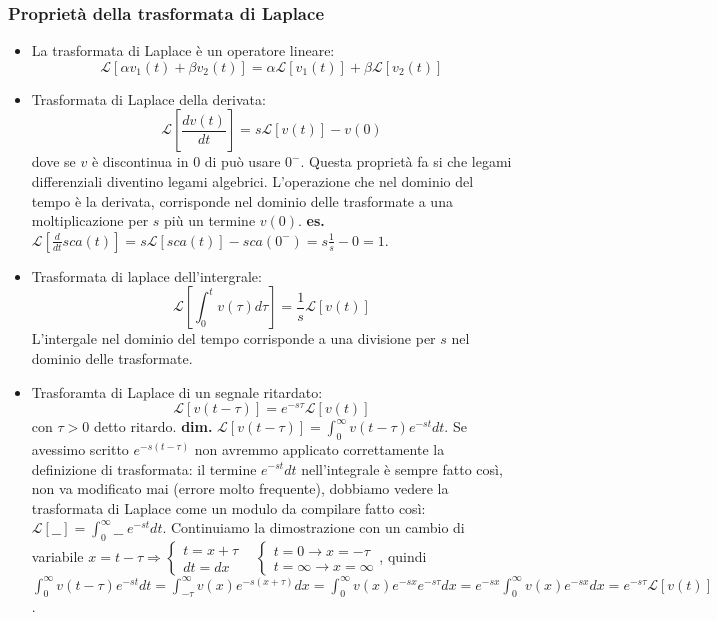 \subsubsection{Proprietà della trasformata di Laplace}
\begin{itemize}
    \item La trasformata di Laplace è un operatore lineare:
    \[
        \mathcal{L}[\alpha v_1(t) + \beta v_2(t)] = \alpha \mathcal{L}[v_1(t)] + \beta \mathcal{L}[v_2(t)]
    \]
    \item Trasformata di Laplace della derivata: 
    \[
        \mathcal{L}[\frac{dv(t)}{dt}] = s \mathcal{L}[v(t)]-v(0)
    \] dove se $v$ è discontinua in $0$ di può usare $0^-$.\newline
    Questa proprietà fa si che legami differenziali diventino legami algebrici. L'operazione che nel dominio del tempo è la derivata, corrisponde nel dominio delle trasformate a una moltiplicazione per $s$ più un termine $v(0)$.\newline
    \textbf{es.} $\mathcal{L}[\frac{d}{dt}sca(t)] = s \mathcal{L}[sca(t)] - sca(0^-) = s \frac{1}{s}-0 = 1$.
    \item Trasformata di laplace dell'intergrale:
    \[
        \mathcal{L}[\int_{0}^{t}v(\tau)d \tau] = \frac{1}{s} \mathcal{L}[v(t)]
    \]
    L'intergale nel dominio del tempo corrisponde a una divisione per $s$ nel dominio delle trasformate.
    \item Trasforamta di Laplace di un segnale ritardato:
    \[
        \mathcal{L}[v(t-\tau)] = e^{-s \tau} \mathcal{L}[v(t)]
    \] con $\tau > 0$ detto ritardo.\newline
    \textbf{dim.} $\mathcal{L}[v(t-\tau)] = \int_{0}^{\infty}v(t-\tau) e^{-st}dt$. Se avessimo scritto $e^{-s(t-\tau)}$ non avremmo applicato correttamente la definizione di trasformata: il termine $e^{-st}dt$ nell'integrale è sempre fatto così, non va modificato mai (errore molto frequente), dobbiamo vedere la trasformata di Laplace come un modulo da compilare fatto così: $\mathcal{L}[\_\_] = \int_{0}^{\infty}\_\_ \; e^{-st}dt$. Continuiamo la dimostrazione con un cambio di variabile $x = t-\tau \Rightarrow \begin{cases}
        t = x + \tau\\ dt = dx
    \end{cases} \;\;\;\begin{cases}
        t=0 \rightarrow x = - \tau\\ t= \infty \rightarrow  x= \infty
    \end{cases}$, quindi $\int_{0}^{\infty}v(t-\tau) e^{-st}dt = \int_{-\tau}^{\infty} v(x) e^{-s(x+ \tau)}dx = \int_{0}^{\infty}v(x) e^{-sx}e^{-s \tau}dx = e^{-sx}\int_{0}^{\infty}v(x)e^{-sx}dx = e^{-s \tau} \mathcal{L}[v(t)]$.
\end{itemize}
\ \newline